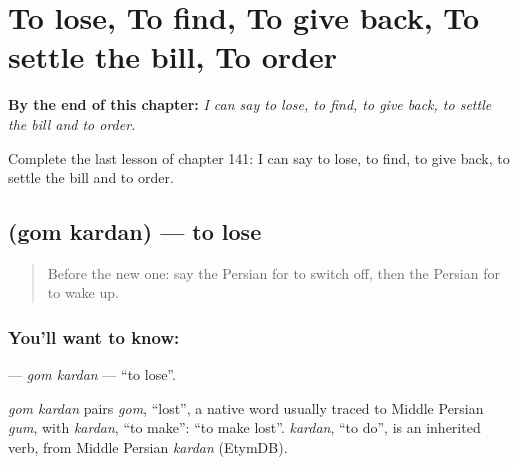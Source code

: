 
\chapter{To lose, To find, To give back, To settle the bill, To order}
\label{ch:fa-to-lose-to-find-to-give-back-to-settle-the-bill-to-order}

\begin{chapteropening}
\textbf{By the end of this chapter:} \emph{I can say to lose, to find, to give back, to settle the bill and to order.}

Complete the last lesson of chapter 141: I can say to lose, to find, to give back, to settle the bill and to order.
\end{chapteropening}

\section[\texorpdfstring{\fa{گم} \fa{کردن} (gom kardan)}{گم کردن (gom kardan)}]{  (gom kardan) — to lose}

\label{lesson:FA-C141-gom-kardan}



\begin{quote}
Before the new one: say the Persian for to switch off, then the Persian for to wake up.
\end{quote}

\subsection*{You'll want to know:  }
\textbf{ } — \emph{gom kardan} — \textquotedblleft{}to lose\textquotedblright{}.

\begin{cousinweb}
\emph{gom kardan} pairs \emph{gom}, \textquotedblleft{}lost\textquotedblright{}, a native word usually traced to Middle Persian \emph{gum}, with \emph{kardan}, \textquotedblleft{}to make\textquotedblright{}: \textquotedblleft{}to make lost\textquotedblright{}. \emph{kardan}, \textquotedblleft{}to do\textquotedblright{}, is an inherited verb, from Middle Persian \emph{kardan} (EtymDB).
\end{cousinweb}

